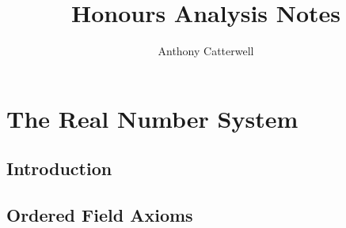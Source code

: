\documentclass[11pt,a4paper]{article}
\title{Honours Analysis Notes}
\author{Anthony Catterwell}
\begin{document}
\maketitle
\tableofcontents

\break{}

\section{The Real Number System}

\subsection{Introduction}

\subsection{Ordered Field Axioms}
\end{document}
